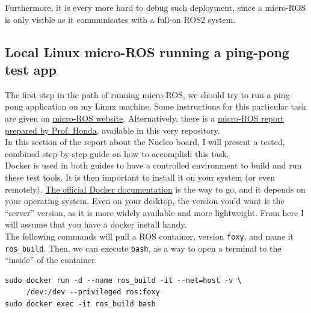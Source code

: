 \documentclass[10pt]{article}
\begin{document}
Furthermore, it is every more hard to debug such deployment, since a micro-ROS is only visible as it communicates with a full-on ROS2 system.

\subsection{Local Linux micro-ROS running a ping-pong test app}
\label{sec:local-linux-micro}
The first step in the path of running micro-ROS, we should try to run a ping-pong application on my Linux machine.
Some instructions for this particular task are given on \href{https://micro.ros.org/docs/tutorials/core/first_application_linux/}{micro-ROS website}.
Alternatively, there is a \href{}{micro-ROS report prepared by Prof. Honda}, available in this very repository.\\

In this section of the report about the Nucleo board, I will present a tested, combined step-by-step guide on how to accomplish this task.\\

Docker is used in both guides to have a controlled environment to build and run these test tools.
It is then important to install it on your system (or even remotely). \href{https://docs.docker.com/engine/install/}{The official Docker documentation} is the way to go, and it depends on your operating system. Even on your desktop, the version you'd want is the ``server'' version, as it is more widely available and more lightweight. From here I will assume that you have a docker install handy.\\


The following commands will pull a ROS container, version \verb|foxy|, and name it \verb|ros_build|.
Then, we can execute \verb|bash|, as a way to open a terminal to the ``inside'' of the container.
\begin{tcolorbox}
\begin{verbatim}
sudo docker run -d --name ros_build -it --net=host -v \
     /dev:/dev --privileged ros:foxy
sudo docker exec -it ros_build bash
\end{verbatim}
\end{tcolorbox}
\end{document}
